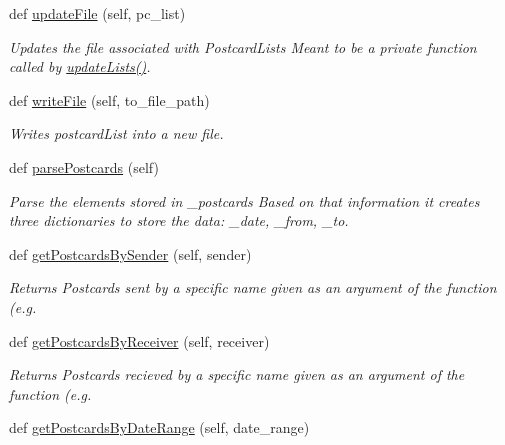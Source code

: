 \begin{DoxyCompactItemize}
def \mbox{\hyperlink{classexam__solution_1_1PostcardList_a766960e1e2aef673787fafb9e1ba41f4}{update\+File}} (self, pc\+\_\+list)
\begin{DoxyCompactList}\small\item\em Updates the file associated with Postcard\+Lists Meant to be a private function called by \mbox{\hyperlink{classexam__solution_1_1PostcardList_aea8bf1e9f97027f792b4f0d7b6ca6e55}{update\+Lists()}}. \end{DoxyCompactList}\item 
def \mbox{\hyperlink{classexam__solution_1_1PostcardList_a42a5668fee4754dde1e3fd0b3d8a992e}{write\+File}} (self, to\+\_\+file\+\_\+path)
\begin{DoxyCompactList}\small\item\em Writes postcard\+List into a new file. \end{DoxyCompactList}\item 
\mbox{\label{classexam__solution_1_1PostcardList_a3d34fe21e658f04f6c8d817ab86eb576}} 
def \mbox{\hyperlink{classexam__solution_1_1PostcardList_a3d34fe21e658f04f6c8d817ab86eb576}{parse\+Postcards}} (self)
\begin{DoxyCompactList}\small\item\em Parse the elements stored in \+\_\+postcards Based on that information it creates three dictionaries to store the data\+: \+\_\+date, \+\_\+from, \+\_\+to. \end{DoxyCompactList}\item 
def \mbox{\hyperlink{classexam__solution_1_1PostcardList_aaae0e8f143179e658fcb4e5275dc4b70}{get\+Postcards\+By\+Sender}} (self, sender)
\begin{DoxyCompactList}\small\item\em Returns Postcards sent by a specific name given as an argument of the function (e.\+g. \end{DoxyCompactList}\item 
def \mbox{\hyperlink{classexam__solution_1_1PostcardList_a297ba4e9d4ef6770d4da3ec0366bd7bb}{get\+Postcards\+By\+Receiver}} (self, receiver)
\begin{DoxyCompactList}\small\item\em Returns Postcards recieved by a specific name given as an argument of the function (e.\+g. \end{DoxyCompactList}\item 
def \mbox{\hyperlink{classexam__solution_1_1PostcardList_aa4e768d91d72fe0b33f467119d065a87}{get\+Postcards\+By\+Date\+Range}} (self, date\+\_\+range)

\end{DoxyCompactItemize}
